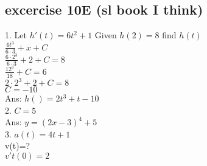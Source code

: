 \documentclass{article}
\begin{document}
  \subsection{excercise 10E (sl book I think)}
  1. Let $h'(t)=6t^2+1$ Given $h(2)=8$ find $h(t)$\\
  $\frac{6t^3}{6\cdot3}+x+C$\\
  $\frac{6\cdot2^3}{6\cdot3}+2+C=8$\\
  $\frac{12^3}{18}+C=6$\\
  $2\cdot 2^3+2+C=8$\\
  $C=-10$\\
  Ans: $h()=2t^3+t-10$\\
  2. $C=5$\\
  Ans: $y=(2x-3)^4+5$\\
  3. $a(t)=4t+1$\\
  v(t)=?\\
  $v't(0)=2$\\


  
   
\end{document}
